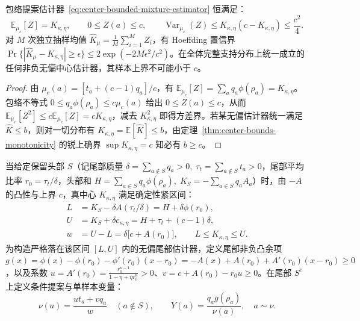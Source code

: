 \documentclass[lang=cn,scheme=chinese,openany]{elegantbook}
\newcommand{\E}{\mathbb E}
\newcommand{\Var}{\operatorname{Var}}
\begin{document}
\begin{theorem}[幂均值教师中心估计的最小统一样本上界]
\label{thm:center-bounded-estimator}
包络提案估计器~\eqref{eq:center-bounded-mixture-estimator} 恒满足：
\begin{equation}
 \E_{\mu_c}[Z]=K_{\kappa,\eta},\qquad 0\le Z(a)\le c,\qquad
 \Var_{\mu_c}(Z)\le K_{\kappa,\eta}(c-K_{\kappa,\eta})\le\frac{c^2}{4}.
\end{equation}
对 $M$ 次独立抽样均值 $\widehat K_\mu=\frac1M\sum_{i=1}^M Z_i$，有 Hoeffding 置信界 $\Pr\{|\widehat K_\mu-K_{\kappa,\eta}|\ge\epsilon\}\le 2\exp(-2M\epsilon^2/c^2)$。在全体完整支持分布上统一成立的任何非负无偏中心估计器，其样本上界不可能小于 $c$。
\end{theorem}
\begin{proof}
由 $\mu_c(a)=[t_a+(c-1)q_a]/c$，有 $\E_{\mu_c}[Z]=\sum_a q_a\phi(\rho_a)=K_{\kappa,\eta}$。包络不等式 $0\le q_a\phi(\rho_a)\le c\mu_c(a)$ 给出 $0\le Z(a)\le c$，从而 $\E_{\mu_c}[Z^2]\le c\E_{\mu_c}[Z]=c K_{\kappa,\eta}$，减去 $K_{\kappa,\eta}^2$ 即得方差界。若某无偏估计器统一满足 $\widehat K\le b$，则对一切分布有 $K_{\kappa,\eta}=\E[\widehat K]\le b$，由定理~\ref{thm:center-bounds-monotonicity} 的锐上确界 $\sup K_{\kappa,\eta}=c$ 知必有 $b\ge c$。
\end{proof}

当给定保留头部 $S$（记尾部质量 $\delta=\sum_{a\notin S}q_a>0,\;\tau_t=\sum_{a\notin S}t_a>0$，尾部平均比率 $r_0=\tau_t/\delta$，头部和 $H=\sum_{a\in S}q_a\phi(\rho_a),\;K_S=-\sum_{a\in S}q_a A_a$）时，由 $-A$ 的凸性与上界 $c$，真中心 $K_{\kappa,\eta}$ 满足确定性紧区间：
\begin{align}
 L&=K_S-\delta A(\tau_t/\delta)=H+\delta\phi(r_0),\\
 U&=K_S+\delta c_{\kappa,\eta}=H+\tau_t+(c-1)\delta,\\
 w&=U-L=\delta\bigl[c+A(r_0)\bigr],\qquad L\le K_{\kappa,\eta}\le U.
 \label{eq:center-head-tail-interval,eq:center-tail-interval-lu}
\end{align}
为构造严格落在该区间 $[L,U]$ 内的无偏尾部估计器，定义尾部非负凸余项 $g(x)=\phi(x)-\phi(r_0)-\phi'(r_0)(x-r_0)=-A(x)+A(r_0)+A'(r_0)(x-r_0)\ge 0$，以及系数 $u=A'(r_0)=\frac{r_0^{\kappa-1}}{1-\eta+\eta r_0^\kappa}>0$、$v=c+A(r_0)-r_0 u\ge 0$。在尾部 $S^c$ 上定义条件提案与单样本变量：
\begin{equation}
 \nu(a)=\frac{u t_a+v q_a}{w}\quad(a\notin S),\qquad
 Y(a)=\frac{q_a g(\rho_a)}{\nu(a)},\quad a\sim\nu.
\end{equation}
\end{document}
